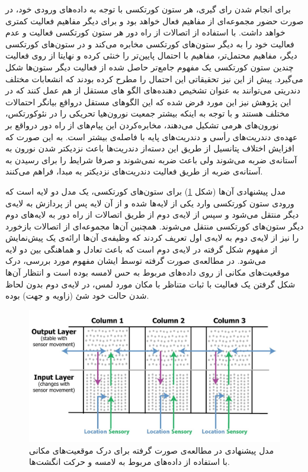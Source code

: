 \documentclass[12pt]{report}
\begin{document}
	برای انجام شدن رای گیری، هر ستون کورتکسی با توجه به داده‌های ورودی خود، در صورت حضور مجموعه‌ای از مفاهیم فعال خواهد بود و برای دیگر مفاهیم فعالیت کمتری خواهد داشت. با استفاده از اتصالات از راه دور هر ستون کورتکسی فعالیت و عدم فعالیت خود را به دیگر ستون‌های کورتکسی مخابره می‌کند و در ستون‌های کورتکسی دیگر، مفاهیم محتمل‌تر، مفاهیم با احتمال پایین‌تر را خنثی کرده و نهایتا از روی فعالیت چندین ستون کورتکسی یک مفهوم جامع‌تر حاصل شده از فعالیت دیگر ستون‌ها شکل می‌گیرد. پیش از این نیز تحقیقاتی این احتمال را مطرح کرده بودند که انشعابات مختلف دندریتی می‌توانند به عنوان تشخیص دهنده‌های الگو های مستقل از هم عمل کنند \cite{POIRAZI2003989, Polsky2004} که در این پژوهش نیز این مورد فرض شده که این الگو‌های مستقل درواقع بیانگر احتمالات مختلف هستند و با توجه به اینکه بیشتر جمعیت نورون‌هیا تحریکی را در نئوکورتکس، نورون‌های هرمی تشکیل می‌دهند، مخابره‌کردن این پیام‌های از راه دور درواقع بر عهده‌ی دندریت‌های رأسی و دندریت‌های پایه‌ با فاصله‌ی بیشتر است. به این صورت که افزایش اختلاف پتانسیل از طریق این دسته‌از دندریت‌ها باعث نزدیکتر شدن نورون به آستانه‌ی ضربه می‌شوند ولی باعث ضربه نمی‌شوند و صرفا شرایط را برای رسیدن به آستانه‌ی ضربه از طریق فعالیت دندریت‌های نزدیکتر به مبدا، فراهم می‌کنند.
	
	مدل پیشنهادی آن‌ها (شکل \ref{fig:hawkins2017}) برای ستون‌های کورتکسی، یک مدل دو لایه‌ است که ورودی ستون کورتکسی وارد یکی از لایه‌ها شده و از آن لایه پس از پردازش به لایه‌ی دیگر منتقل می‌شود و سپس از لایه‌‌ی دوم از طریق اتصالات از راه دور به لا‌‌یه‌های دوم دیگر ستون‌های کورتکسی منتقل می‌شوند. همچنین آن‌ها مجموعه‌ای از اتصالات بازخورد را نیز از لایه‌ی دوم به لا‌یه‌ی اول تعریف کردند که وظیفه‌ی آن‌ها ارائه‌ی یک پیش‌نمایش از مفهوم‌ شکل گرفته در لايه‌ی دوم است که باعث تعادل و هماهنگی بین دو لایه‌ می‌شود. در مطالعه‌ی صورت گرفته توسط ایشان\cite{Hawkins2017} مفهوم مورد بررسی، درک موقعیت‌های مکانی از روی داده‌های مربوط به حس لامسه بوده است و انتظار آن‌ها شکل گرفتن یک فعالیت با ثبات متناظر با مکان مورد لمس، در لایه‌ی دوم بدون لحاظ شدن حالت خود شئ (زاویه و جهت) بوده. 
	
	\begin{figure}[H]
		\centering
		\includegraphics[width=1.0\linewidth]{hawkins2017.jpg}
		\caption[NS]{
			مدل پیشنهادی در مطالعه‌ی صورت گرفته \cite{Hawkins2017} برای درک موقعیت‌های مکانی با استفاده از داده‌های مربوط به لامسه و حرکت انگشت‌ها.
		}
		\label{fig:hawkins2017} 
	\end{figure}
\end{document}
